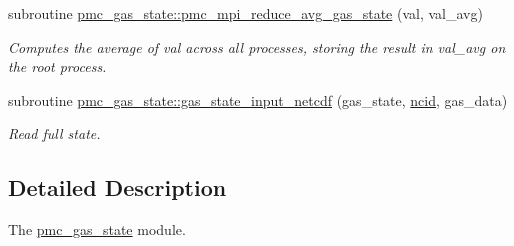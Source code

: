 \begin{DoxyCompactItemize}
subroutine \mbox{\hyperlink{namespacepmc__gas__state_abd055facc753ab5852638928dfc1f7eb}{pmc\+\_\+gas\+\_\+state\+::pmc\+\_\+mpi\+\_\+reduce\+\_\+avg\+\_\+gas\+\_\+state}} (val, val\+\_\+avg)
\begin{DoxyCompactList}\small\item\em Computes the average of val across all processes, storing the result in val\+\_\+avg on the root process. \end{DoxyCompactList}\item 
subroutine \mbox{\hyperlink{namespacepmc__gas__state_a1d5cd181f15a8489399a542e0ab98810}{pmc\+\_\+gas\+\_\+state\+::gas\+\_\+state\+\_\+input\+\_\+netcdf}} (gas\+\_\+state, \mbox{\hyperlink{fractal_8_f90_a4e89f3f850921ff84a6dfce8b166ad50}{ncid}}, gas\+\_\+data)
\begin{DoxyCompactList}\small\item\em Read full state. \end{DoxyCompactList}\end{DoxyCompactItemize}


\subsection{Detailed Description}
The \mbox{\hyperlink{namespacepmc__gas__state}{pmc\+\_\+gas\+\_\+state}} module. 

